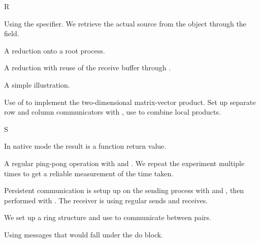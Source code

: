  {R}


Using the  specifier. We retrieve the
actual source from the  object through the
 field.
%
%


A reduction onto a root process.
%

A reduction with reuse of the receive buffer through
.
%


A simple illustration.
%

Use of  to implement the two-dimensional
matrix-vector product.
Set up separate row and column communicators with
, use  to combine
local products.
%

 {S}


In native mode the result is a function return value.
%


A regular ping-pong operation with  and
. We repeat the experiment multiple times to
get a reliable measurement of the time taken.
%
%
%


Persistent communication is setup up on the sending process with
 and , then
performed with . The receiver is using
regular sends and receives.
%
%


We set up a ring structure and use  to communicate
between pairs.
%


Using  messages that would fall under the
 do block.
%

